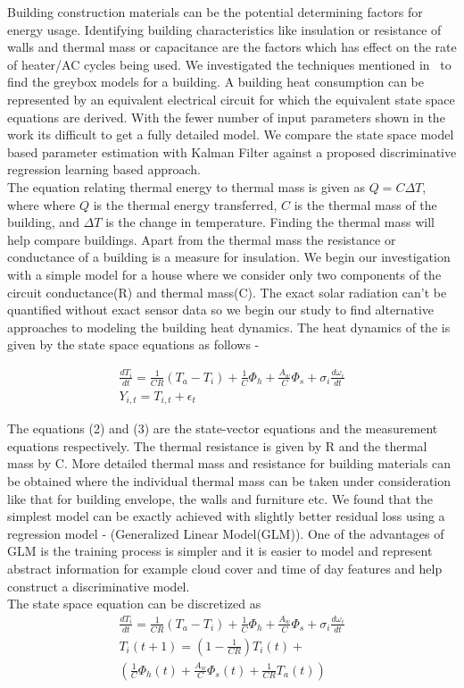 \documentclass{sig-alternate}
\begin{document}
 \indent Building construction materials can be the potential determining factors for energy usage. Identifying building characteristics like insulation or resistance of walls and thermal mass or capacitance are the factors which has effect on the rate of heater/AC cycles being used. We investigated the techniques mentioned in~\cite{modeling} to find the greybox models for a building. A building heat consumption can be represented by an equivalent electrical circuit for which the equivalent state space equations are derived. With the fewer number of input parameters shown in the work its difficult to get a fully detailed model. We compare the state space model based parameter estimation with Kalman Filter against a proposed discriminative regression learning based approach.\\
 \indent The equation relating thermal energy to thermal mass is given as $Q = C \Delta T$, where where $Q$ is the thermal energy transferred, $C$ is the thermal mass of the building, and $\Delta T$ is the change in temperature. Finding the thermal mass will help compare buildings. Apart from the thermal mass the resistance or conductance of a building is a measure for insulation. We begin our investigation with a simple model for a house where we consider only two components of the circuit conductance(R) and thermal mass(C). The exact solar radiation can't be quantified without exact sensor data so we begin our study to find alternative approaches to modeling the building heat dynamics. The heat dynamics of the is given by the state space equations as follows - 
 
 \begin{eqnarray}
 \frac{dT_i}{dt} = \frac{1}{C  R} (T_a-T_i) + \frac{1}{C}\Phi_h + \frac{A_w}{C} \Phi_s + \sigma_i \frac{d\omega_i}{dt}\\
 Y_{i,t} = T_{i,t} + \epsilon_t
\end{eqnarray}  

 \indent The equations (2) and (3) are the state-vector equations and the measurement equations respectively. The thermal resistance is given by R and the thermal mass by C. More detailed thermal mass and resistance for building materials can be obtained where the individual thermal mass can be taken under consideration like that for building envelope, the walls and furniture etc. We found that the simplest model can be exactly achieved with slightly better residual loss using a regression model - (Generalized Linear Model(GLM)). One of the advantages of GLM is the training process is simpler and it is easier to model and represent abstract information for example cloud cover and time of day features and help construct a discriminative model. \\
 \indent The state space equation can be discretized as \begin{eqnarray}
 \frac{dT_i}{dt} = \frac{1}{CR} (T_a-T_i) + \frac{1}{C}\Phi_h + \frac{A_w}{C} \Phi_s + \sigma_i \frac{d\omega_i}{dt} \\
  T_i(t+1)  = (1 - \frac{1}{CR}) T_i(t)+\nonumber \\  (\frac{1}{C}\Phi_h(t) + \frac{A_w}{C} \Phi_s(t) + \frac{1}{CR}T_a(t))
\end{eqnarray}  
  
\end{document}
